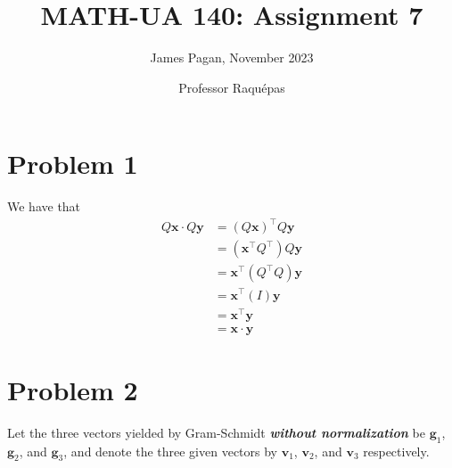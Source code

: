 \documentclass[11pt]{article}
\title{MATH-UA 140: Assignment 7}
\author{James Pagan, November 2023}
\date{Professor Raquépas}
\renewcommand{\vec}[1]{\mathbf{#1}}
\begin{document}
\maketitle
\tableofcontents


\section{Problem 1}

We have that
\begin{align*}
	Q \vec{x} \cdot Q \vec{y} &= (Q \vec{x})^{\top} Q \vec{y} \\
	&= (\vec{x}^{\top}Q^{\top})Q \vec{y} \\
	&= \vec{x}^{\top} (Q^{\top}Q) \vec{y} \\
	&= \vec{x}^{\top} (I) \vec{y} \\
	&= \vec{x}^{\top} \vec{y} \\
	&= \vec{x} \cdot \vec{y}
\end{align*}


\section{Problem 2}

Let the three vectors yielded by Gram-Schmidt \textbf{\textit{without normalization}} be $\vec{g}_{1}$, $\vec{g}_{2}$, and $\vec{g}_{3}$, and denote the three given vectors by $\vec{v}_{1}$, $\vec{v}_{2}$, and $\vec{v}_{3}$ respectively.
\end{document}
